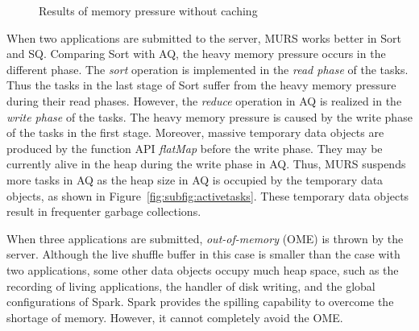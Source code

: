 \begin{figure*}[!t]
\centering
{}
\vspace*{-2mm}
\caption{Results of memory pressure without caching}
\vspace*{-4mm}
\label{fig:pressurewithoutcache}
\end{figure*}

When two applications are submitted to the server, MURS works better in Sort and SQ. Comparing Sort with AQ, the heavy memory pressure occurs in the different phase. The \textit{sort} operation is implemented in the \textit{read phase} of the tasks. Thus the tasks in the last stage of Sort suffer from the heavy memory pressure during their read phases. However, the \textit{reduce} operation in AQ is realized in the \textit{write phase} of the tasks. The heavy memory pressure is caused by the write phase of the tasks in the first stage. Moreover, massive temporary data objects are produced by the function API \textit{flatMap} before the write phase. They may be currently alive in the heap during the write phase in AQ. 
Thus, MURS suspends more tasks in AQ as the heap size in AQ is occupied by the temporary data objects, as shown in Figure~\ref{fig:subfig:activetasks}. These temporary data objects result in frequenter garbage collections. 

When three applications are submitted, \textit{out-of-memory} (OME) is thrown by the server. Although the live shuffle buffer in this case is smaller than the case with two applications, some other data objects occupy much heap space, such as the recording of living applications, the handler of disk writing, and the global configurations of Spark. Spark provides the spilling capability to overcome the shortage of memory. However, it cannot completely avoid the OME.

